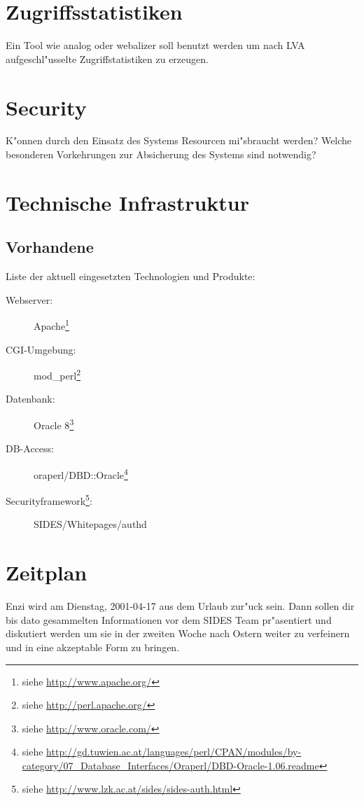 \documentclass[12pt,a4paper]{article}
\begin{document}
\section{Zugriffsstatistiken}

Ein Tool wie analog oder webalizer soll benutzt werden um nach LVA
aufgeschl"usselte Zugriffstatistiken zu erzeugen.

\section{Security}

K"onnen durch den Einsatz des Systems Resourcen mi"sbraucht werden?  Welche
besonderen Vorkehrungen zur Absicherung des Systems sind notwendig?

\section{Technische Infrastruktur}

\subsection{Vorhandene}

Liste der aktuell eingesetzten Technologien und Produkte:
\begin{description}
\item[Webserver:]{Apache\footnote{siehe \url{http://www.apache.org/}}}
\item[CGI-Umgebung:]{mod\_perl\footnote{siehe \url{http://perl.apache.org/}}}
\item[Datenbank:]{Oracle 8\footnote{siehe \url{http://www.oracle.com/}}}
\item[DB-Access:]{oraperl/DBD::Oracle\footnote{siehe 
\url{http://gd.tuwien.ac.at/languages/perl/CPAN/modules/by-category/07_Database_Interfaces/Oraperl/DBD-Oracle-1.06.readme}}}
\item[Securityframework\footnote{siehe \url{http://www.lzk.ac.at/sides/sides-auth.html}}:]{SIDES/Whitepages/authd}
\end{description}

\section{Zeitplan}

Enzi wird am Dienstag, 2001-04-17 aus dem Urlaub zur"uck sein. Dann sollen
dir bis dato gesammelten Informationen vor dem SIDES Team pr"asentiert und
diskutiert werden um sie in der zweiten Woche nach Ostern weiter zu
verfeinern und in eine akzeptable Form zu bringen.
\end{document}
